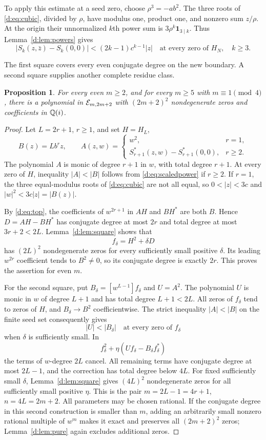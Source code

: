 \documentclass[UTF8,11pt]{ctexart}
\newtheorem{prop}[thm]{Proposition}
\theoremstyle{definition}
\numberwithin{equation}{section}
\begin{document}
To apply this estimate at a seed zero, choose $\rho^3=-ab^2$.
The three roots of \eqref{d:eq:cubic}, divided by $\rho$, have modulus one,
product one, and nonzero sum $z/\rho$. At the origin their unnormalized
$k$th power sum is $3\rho^k\mathbf1_{3\mid k}$. Thus
Lemma~\ref{d:lem:powers} gives
\begin{equation}\label{d:eq:scaledpower}
 |S_k(z,\bar z)-S_k(0,0)|<(2k-1)c^{k-1}|z|
 \quad\text{at every zero of }H_N,\quad k\ge3.
\end{equation}

The first square covers every even conjugate degree on the new boundary.
A second square supplies another complete residue class.
\begin{prop}\label{d:prop:two}
For every even $m\ge2$, and for every $m\ge5$ with $m\equiv1\pmod4$,
there is a polynomial in $\mathcal E_{m,2m+2}$ with $(2m+2)^2$
nondegenerate zeros and coefficients in $\mathbb Q(i)$.
\end{prop}
\begin{proof}
Let $L=2r+1$, $r\ge1$, and set $H=H_L$,
\[
 B(z)=Lb^rz,\qquad
 A(z,w)=\begin{cases}
 w^2,&r=1,\\
 S_{r+1}^*(z,w)-S_{r+1}^*(0,0),&r\ge2.
 \end{cases}
\]
The polynomial $A$ is monic of degree $r+1$ in $w$, with total degree
$r+1$. At every zero of $H$, inequality $|A|<|B|$ follows from
\eqref{d:eq:scaledpower} if $r\ge2$. If $r=1$, the three equal-modulus
roots of \eqref{d:eq:cubic} are not all equal, so $0<|z|<3c$ and
$|w|^2<3c|z|=|B(z)|$.

By \eqref{d:eq:top}, the coefficients of $w^{2r+1}$ in $AH$ and $BH^*$
are both $B$. Hence $D=AH-BH^*$ has conjugate degree at most $2r$ and
total degree at most $3r+2<2L$. Lemma~\ref{d:lem:square} shows that
\[
 f_\delta=H^2+\delta D
\]
has $(2L)^2$ nondegenerate zeros for every sufficiently small positive
$\delta$. Its leading $w^{2r}$ coefficient tends to $B^2\ne0$, so its
conjugate degree is exactly $2r$. This proves the assertion for even $m$.

For the second square, put $B_\delta=[w^{L-1}]f_\delta$ and $U=A^2$.
The polynomial $U$ is monic in $w$ of degree $L+1$ and has total degree
$L+1<2L$. All zeros of $f_\delta$ tend to zeros of $H$, and
$B_\delta\to B^2$ coefficientwise. The strict inequality $|A|<|B|$ on
the finite seed set consequently gives
\[
 |U|<|B_\delta|\quad\text{at every zero of }f_\delta
\]
when $\delta$ is sufficiently small. In
\[
 f_\delta^2+\eta(Uf_\delta-B_\delta f_\delta^*)
\]
the terms of $w$-degree $2L$ cancel. All remaining terms have conjugate
degree at most $2L-1$, and the correction has total degree below $4L$.
For fixed sufficiently small $\delta$, Lemma~\ref{d:lem:square} gives
$(4L)^2$ nondegenerate zeros for all sufficiently small positive $\eta$.
This is the pair $m=2L-1=4r+1$, $n=4L=2m+2$.
All parameters may be chosen rational. If the conjugate degree in this
second construction is smaller than $m$, adding an arbitrarily small
nonzero rational multiple of $w^m$ makes it exact and preserves all
$(2m+2)^2$ zeros; Lemma~\ref{d:lem:pure} again excludes additional zeros.
\end{proof}
\end{document}
